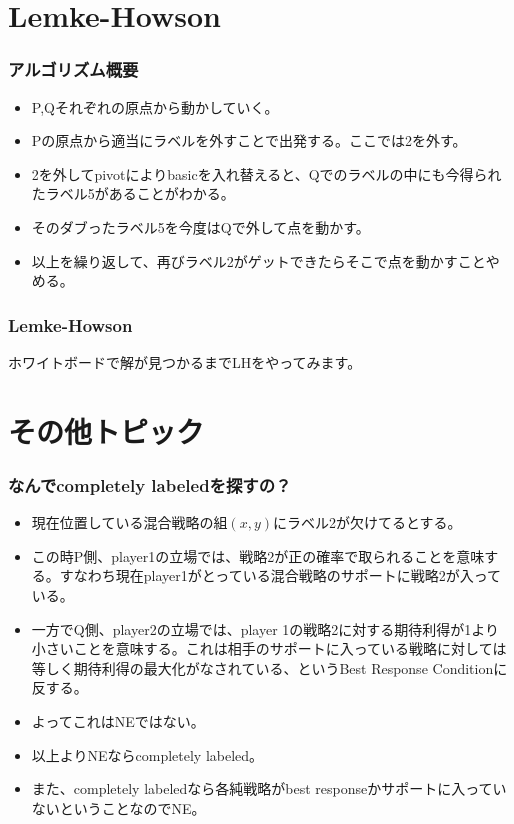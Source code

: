 \documentclass[dvipdfmx, 12pt]{beamer}
\begin{document}
\section{Lemke-Howson}
\begin{frame}\frametitle{アルゴリズム概要}
\begin{itemize}
	\item P,Qそれぞれの原点から動かしていく。
	\item Pの原点から適当にラベルを外すことで出発する。ここでは2を外す。
	\item 2を外してpivotによりbasicを入れ替えると、Qでのラベルの中にも今得られたラベル5があることがわかる。
	\item そのダブったラベル5を今度はQで外して点を動かす。
	\item 以上を繰り返して、再びラベル2がゲットできたらそこで点を動かすことやめる。
\end{itemize}
\end{frame}

\begin{frame}\frametitle{Lemke-Howson}
ホワイトボードで解が見つかるまでLHをやってみます。
\end{frame}

\section{その他トピック}
\begin{frame}\frametitle{なんでcompletely labeledを探すの？}
	\begin{itemize}
		\item 現在位置している混合戦略の組$(x, y)$にラベル2が欠けてるとする。
		\item この時P側、player1の立場では、戦略2が正の確率で取られることを意味する。すなわち現在player1がとっている混合戦略のサポートに戦略2が入っている。
		\item 一方でQ側、player2の立場では、player 1の戦略2に対する期待利得が1より小さいことを意味する。これは相手のサポートに入っている戦略に対しては等しく期待利得の最大化がなされている、というBest Response Conditionに反する。
		\item よってこれはNEではない。
		\item 以上よりNEならcompletely labeled。
		\item また、completely labeledなら各純戦略がbest responseかサポートに入っていないということなのでNE。
	\end{itemize}
\end{frame}
\end{document}

